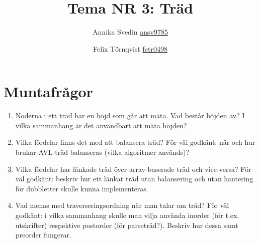 \documentclass[a5paper,10pt,oneside]{article}
\title{Tema NR 3: Träd}
\author{Annika Svedin \url{ansv9785} \and Felix Törnqvist \url{fetr0498}}
\begin{document}
\maketitle

\section*{Muntafrågor}

\begin{enumerate}

\item

Noderna i ett träd har en höjd som går att mäta. Vad består höjden av? I vilka sammanhang är det användbart att mäta höjden?



\item
Vilka fördelar finns det med att balansera träd? För väl godkänt: när och hur brukar AVL-träd balanseras (vilka algoritmer används)?

\item
Vilka fördelar har länkade träd över array-baserade träd och vice-versa? För väl godkänt: beskriv hur ett länkat träd utan balansering och utan hantering för dubbletter skulle kunna implementeras.

\item
Vad menas med traverseringsordning när man talar om träd? För väl godkänt: i vilka sammanhang skulle man vilja använda inorder (för t.ex. utskrifter) respektive postorder (för parseträd?). Beskriv hur dessa samt preorder fungerar.

\end{enumerate}
\end{document}
